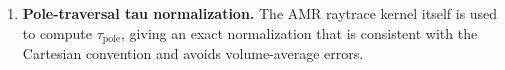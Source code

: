 \documentclass[english,a4paper]{my_memo}
\begin{document}
\begin{enumerate}
  \item \textbf{Pole-traversal tau normalization.}  The AMR raytrace kernel
        itself is used to compute $\tau_\mathrm{pole}$, giving an exact
        normalization that is consistent with the Cartesian convention and
        avoids volume-average errors.
\end{enumerate}
\end{document}
